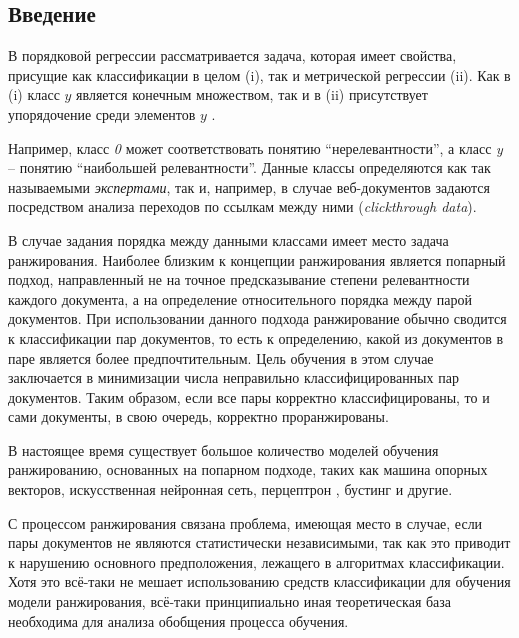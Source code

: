 \documentclass[12pt,a4paper,oneside]{article}
\begin{document}
\begin{multicols}{2}
\chapter{Введение}

\par
В порядковой регрессии рассматривается задача, которая имеет свойства, присущие как классификации в целом (i), так и метрической регрессии (ii). 
Как в (i) класс $y$ является конечным множеством, так и в (ii) присутствует упорядочение среди элементов $y$ .

\par
Например, класс \emph{0} может соответствовать понятию ``нерелевантности'', а класс \emph{y} -- понятию ``наибольшей релевантности''. 
Данные классы определяются как так называемыми \emph{экспертами}, так и, например, в случае веб-документов задаются посредством анализа переходов по ссылкам между ними (\emph{clickthrough data}). 

В случае задания порядка между данными классами имеет место задача ранжирования. 
Наиболее близким к концепции ранжирования является попарный подход, направленный не на точное предсказывание степени релевантности каждого документа, а на определение относительного порядка между парой документов. 
При использовании данного подхода ранжирование обычно сводится к классификации пар документов, то есть к определению, какой из документов в паре является более предпочтительным.
Цель обучения в этом случае заключается в минимизации числа неправильно классифицированных пар документов. 
Таким образом, если все пары корректно классифицированы, то и сами документы, в свою очередь, корректно проранжированы. 

\par
В настоящее время существует большое количество моделей обучения ранжированию, основанных на попарном подходе, таких как машина опорных векторов, искусственная нейронная сеть, перцептрон , бустинг и другие. 


\par
С процессом ранжирования связана проблема, имеющая место в случае, если пары документов не являются статистически независимыми, так как это приводит к нарушению основного предположения, лежащего в алгоритмах классификации. 
Хотя это всё-таки не мешает использованию средств классификации для обучения модели ранжирования, всё-таки принципиально иная теоретическая база необходима для анализа обобщения процесса обучения. 


\end{multicols}
\end{document}

